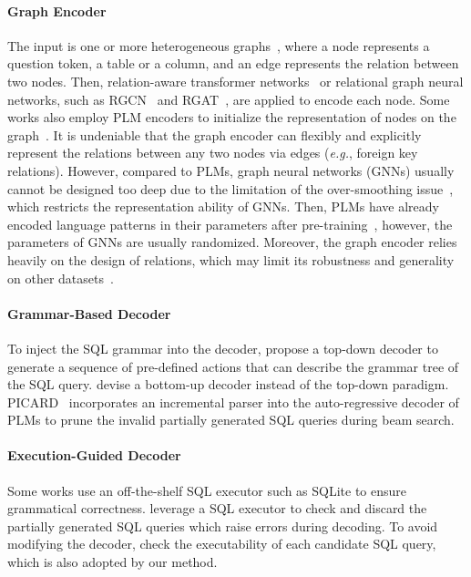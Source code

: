 \documentclass[letterpaper]{article} \usepackage{aaai23}  \usepackage{times}  \usepackage{helvet}  \usepackage{courier}  \usepackage[hyphens]{url}  \usepackage{graphicx} \urlstyle{rm} \def\UrlFont{\rm}  \usepackage{natbib}  \usepackage{caption} \frenchspacing  \setlength{\pdfpagewidth}{8.5in}  \setlength{\pdfpageheight}{11in}  \usepackage{algorithm}
\begin{document}
\paragraph{Graph Encoder} The input is one or more heterogeneous graphs~\citep{bailin2020ratsql, binyuan2022s2sql, ruisheng2021lgesql, ruichu2021sadga}, where a node represents a question token, a table or a column, and an edge represents the relation between two nodes. Then, relation-aware transformer networks~\citep{peter2018self-attention} or relational graph neural networks, such as RGCN~\citep{michael2018modeling} and RGAT~\citep{kai2020relational}, are applied to encode each node. Some works also employ PLM encoders to initialize the representation of nodes on the graph~\citep{ruisheng2021lgesql, bailin2020ratsql, ohad2021smbop}. It is undeniable that the graph encoder can flexibly and explicitly represent the relations between any two nodes via edges (\emph{e.g.}, foreign key relations). However, compared to PLMs, graph neural networks (GNNs) usually cannot be designed too deep due to the limitation of the over-smoothing issue~\citep{deli2020measuring}, which restricts the representation ability of GNNs. Then, PLMs have already encoded language patterns in their parameters after pre-training~\citep{yian2021when}, however, the parameters of GNNs are usually randomized. Moreover, the graph encoder relies heavily on the design of relations, which may limit its robustness and generality on other datasets~\cite{chang2022towards}.

\paragraph{Grammar-Based Decoder} To inject the SQL grammar into the decoder, \citet{pengcheng2017a, jayant2017neural} propose a top-down decoder to generate a sequence of pre-defined actions that can describe the grammar tree of the SQL query. \citet{ohad2021smbop} devise a bottom-up decoder instead of the top-down paradigm. PICARD~\citep{torsten2021picard} incorporates an incremental parser into the auto-regressive decoder of PLMs to prune the invalid partially generated SQL queries during beam search.

\paragraph{Execution-Guided Decoder} Some works use an off-the-shelf SQL executor such as SQLite to ensure grammatical correctness. \citet{chenglong2018robust} leverage a SQL executor to check and discard the partially generated SQL queries which raise errors during decoding. To avoid modifying the decoder, \citet{alane2020exploring} check the executability of each candidate SQL query, which is also adopted by our method.
\end{document}
